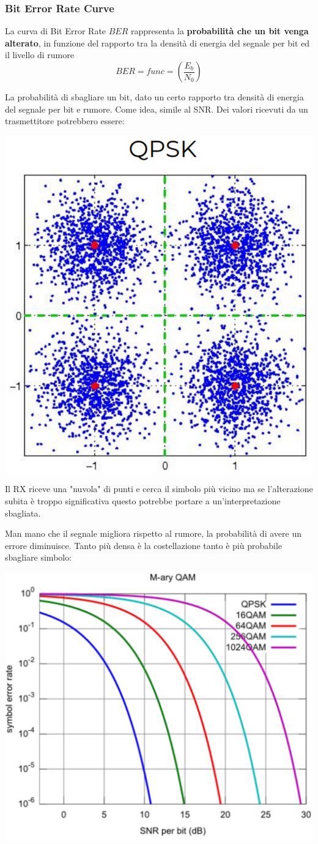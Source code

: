 \subsubsection{Bit Error Rate Curve}

La curva di Bit Error Rate $BER$ rappresenta la \textbf{probabilità che un bit venga alterato}, in funzione del rapporto tra la densità di energia del segnale per bit ed il livello di rumore
$$ BER = func = \left( \frac{E_b}{N_0} \right)$$

La probabilità di sbagliare un bit, dato un certo rapporto tra densità di energia del segnale per bit e rumore. Come idea, simile al SNR. Dei valori ricevuti da un trasmettitore potrebbero essere:
\begin{center}
	\includegraphics[width=0.35\linewidth]{img/wireless/esval}
\end{center}

Il RX riceve una "nuvola" di punti e cerca il simbolo più vicino ma se l'alterazione subita è troppo significativa questo potrebbe portare a un'interpretazione sbagliata. 

Man mano che il segnale migliora rispetto al rumore, la probabilità di avere un errore diminuisce. Tanto più densa è la costellazione tanto è più probabile sbagliare simbolo:
\begin{center}
	\includegraphics[width=0.5\linewidth]{img/wireless/maryqam}
\end{center}

